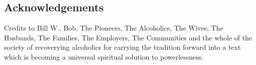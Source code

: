 \begin{fmatterchapter}

\subsection*{Acknowledgements}

Credits to Bill W., Bob, The Pioneers, The Alcoholics, The Wives, 
The Husbands, The Families, The Employers, The Communities 
and the whole of the society of recoverying alcoholics for 
carrying the tradition forward into a text which is becoming a 
universal spiritual solution to powerlessness.

\end{fmatterchapter}

